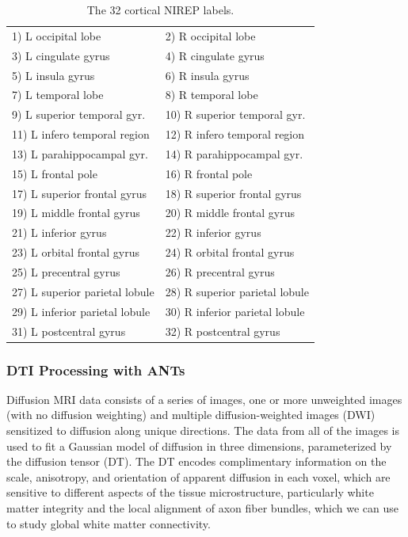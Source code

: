 \begin{table}
\centering
\begin{tabular*}{0.475\textwidth}{@{\extracolsep{\fill}} l l}
\toprule
  1) L occipital lobe & 2) R occipital lobe \\
  3) L cingulate gyrus & 4) R cingulate gyrus \\
  5) L insula gyrus & 6) R insula gyrus \\
  7) L temporal lobe & 8) R temporal lobe \\
  9) L superior temporal gyr. & 10) R superior temporal gyr. \\
  11) L infero temporal region & 12) R infero temporal region \\
  13) L parahippocampal gyr. & 14) R parahippocampal gyr. \\
  15) L frontal pole & 16) R frontal pole \\
  17) L superior frontal gyrus & 18) R superior frontal gyrus \\
  19) L middle frontal gyrus & 20) R middle frontal gyrus \\
  21) L inferior gyrus & 22) R inferior gyrus \\
  23) L orbital frontal gyrus & 24) R orbital frontal gyrus \\
  25) L precentral gyrus & 26) R precentral gyrus \\
  27) L superior parietal lobule & 28) R superior parietal lobule \\
  29) L inferior parietal lobule & 30) R inferior parietal lobule \\
  31) L postcentral gyrus & 32)   R postcentral gyrus \\  
\bottomrule
\end{tabular*}
\caption{The 32 cortical NIREP labels.}
\label{table:nirep_labels}
\end{table}



\subsubsection{DTI Processing with ANTs} 

Diffusion MRI data consists of a series of images, one or more unweighted images (with no diffusion weighting) and multiple diffusion-weighted images (DWI) sensitized to diffusion along unique directions. The data from all of the images is used to fit a Gaussian model of diffusion in three dimensions, parameterized by the diffusion tensor (DT). The DT encodes complimentary information on the scale, anisotropy, and orientation of apparent diffusion in each voxel, which are sensitive to different aspects of the tissue microstructure, particularly white matter integrity and the local alignment of axon fiber bundles, which we can use to study global white matter connectivity. 

